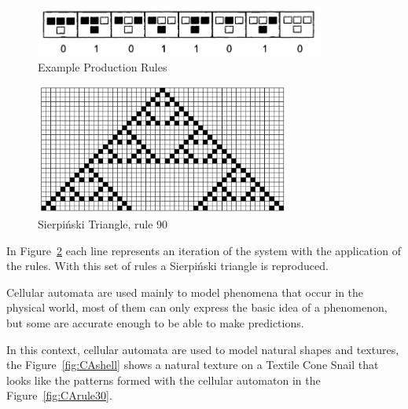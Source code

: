 \begin{figure}[htbp]
	\centering
	\includegraphics[width=0.85\textwidth]{img/Theory/Cellular_A/Rules.png}
	\caption{Example Production Rules\cite{Shiffman2012}}
	\label{fig:CArule}
\end{figure}



\begin{figure}[H]
    \centering
    \includegraphics[width=0.75\textwidth]{img/Theory/Cellular_A/Result.png}
    \caption{Sierpiński Triangle, rule 90}
    \label{fig:resultCA}
\end{figure}


In Figure~\ref{fig:resultCA} each line represents an iteration of the system with the application of the rules. With this set of rules a Sierpiński triangle is reproduced.


Cellular automata are used mainly to model phenomena that occur in the physical world, most of them can only express the basic idea of a phenomenon, but some are accurate enough to be able to make predictions.

In this context, cellular automata are used to model natural shapes and textures, the Figure~\ref{fig:CAshell} shows a natural texture on a Textile Cone Snail that looks like the patterns formed with the cellular automaton in the Figure~\ref{fig:CArule30}.



